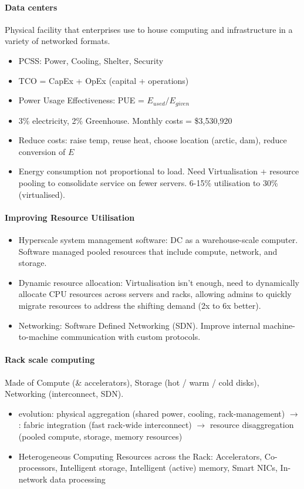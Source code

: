 \paragraph{Data centers} Physical facility that enterprises use to house
computing and infrastructure in a variety of networked formats.
\begin{itemize}
\item PCSS: Power, Cooling, Shelter, Security
\item TCO = CapEx + OpEx (capital + operations)
\item Power Usage Effectiveness: PUE = ${E_{used}} / {E_{given}}$
\item 3\% electricity, 2\% Greenhouse. Monthly costs = \$3,530,920
\item Reduce costs: raise temp, reuse heat, choose location (arctic, dam),
  reduce conversion of $E$
\item Energy consumption not proportional to load. Need Virtualisation +
  resource pooling to consolidate service on fewer servers. 6-15\% utilisation
  to 30\% (virtualised).
\end{itemize}

\paragraph{Improving Resource Utilisation}
\begin{itemize}
\item Hyperscale system management software: DC as a warehouse-scale computer.
  Software managed pooled resources that include compute, network, and
  storage.
\item Dynamic resource allocation: Virtualisation isn't enough, need to
  dynamically allocate CPU resources across servers and racks, allowing admins
  to quickly migrate resources to address the shifting demand (2x to 6x better).
\item Networking: Software Defined Networking (SDN). Improve internal
  machine-to-machine communication with custom protocols.
\end{itemize}

\paragraph{Rack scale computing} Made of Compute (\& accelerators), Storage
(hot / warm / cold disks), Networking (interconnect, SDN).
\begin{itemize}
\item evolution: physical aggregation (shared power, cooling, rack-management)
  $\rightarrow$ : fabric integration (fast rack-wide interconnect)
  $\rightarrow$ resource disaggregation (pooled compute, storage, memory
  resources)
\item Heterogeneous Computing Resources across the Rack: Accelerators,
  Co-processors, Intelligent storage, Intelligent (active) memory, Smart NICs,
  In-network data processing
\end{itemize}
